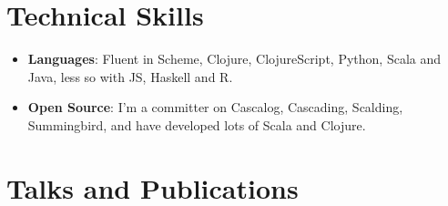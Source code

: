 \documentclass[letterpaper,11pt]{article}
\newcommand{\resumeItem}[2]{\item\small{
    \textbf{#1}{: #2 \vspace{-2pt}}
  }
}
\newcommand{\resumeSubItem}[2]{\resumeItem{#1}{#2}\vspace{-4pt}}
\newcommand{\resumeSubHeadingListStart}{\begin{itemize}[leftmargin=*]}
\newcommand{\resumeSubHeadingListEnd}{\end{itemize}}
\begin{document}
\section{Technical Skills}
\resumeSubHeadingListStart
\resumeSubItem{Languages}{
  Fluent in Scheme, Clojure, ClojureScript, Python, Scala and Java, less so with JS, Haskell and R.}
\resumeSubItem{Open Source}{
  I'm a committer on Cascalog, Cascading, Scalding, Summingbird, and have developed lots of Scala and Clojure.}
\resumeSubHeadingListEnd

\section{Talks and Publications}
\end{document}
